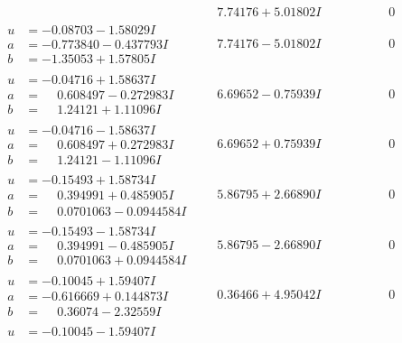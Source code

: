 \documentclass[1p]{elsarticle_modified}
\theoremstyle{definition}
\begin{document}
$$\begin{array}{c|c|c}
 & \phantom{-}7.74176 + 5.01802 I & \phantom{-0.000000 } 0 \\ \hline\begin{aligned}
u &= -0.08703 - 1.58029 I \\
a &= -0.773840 - 0.437793 I \\
b &= -1.35053 + 1.57805 I\end{aligned}
 & \phantom{-}7.74176 - 5.01802 I & \phantom{-0.000000 } 0 \\ \hline\begin{aligned}
u &= -0.04716 + 1.58637 I \\
a &= \phantom{-}0.608497 - 0.272983 I \\
b &= \phantom{-}1.24121 + 1.11096 I\end{aligned}
 & \phantom{-}6.69652 - 0.75939 I & \phantom{-0.000000 } 0 \\ \hline\begin{aligned}
u &= -0.04716 - 1.58637 I \\
a &= \phantom{-}0.608497 + 0.272983 I \\
b &= \phantom{-}1.24121 - 1.11096 I\end{aligned}
 & \phantom{-}6.69652 + 0.75939 I & \phantom{-0.000000 } 0 \\ \hline\begin{aligned}
u &= -0.15493 + 1.58734 I \\
a &= \phantom{-}0.394991 + 0.485905 I \\
b &= \phantom{-}0.0701063 - 0.0944584 I\end{aligned}
 & \phantom{-}5.86795 + 2.66890 I & \phantom{-0.000000 } 0 \\ \hline\begin{aligned}
u &= -0.15493 - 1.58734 I \\
a &= \phantom{-}0.394991 - 0.485905 I \\
b &= \phantom{-}0.0701063 + 0.0944584 I\end{aligned}
 & \phantom{-}5.86795 - 2.66890 I & \phantom{-0.000000 } 0 \\ \hline\begin{aligned}
u &= -0.10045 + 1.59407 I \\
a &= -0.616669 + 0.144873 I \\
b &= \phantom{-}0.36074 - 2.32559 I\end{aligned}
 & \phantom{-}0.36466 + 4.95042 I & \phantom{-0.000000 } 0 \\ \hline\begin{aligned}
u &= -0.10045 - 1.59407 I \\

\end{aligned}
\end{array}$$
\end{document}
